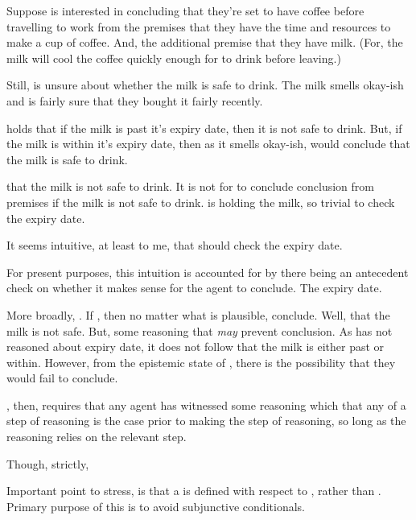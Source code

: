 \begin{note}[\prequ{3}]
  \begin{illustration}
    Suppose  is interested in concluding that they're set to have coffee before travelling to work from the premises that they have the time and resources to make a cup of coffee.
    And, the additional premise that they have milk.
    (For, the milk will cool the coffee quickly enough for  to drink before leaving.)

    Still,  is unsure about whether the milk is safe to drink.
    The milk smells okay-ish and  is fairly sure that they bought it fairly recently.

     holds that if the milk is past it's expiry date, then it is not safe to drink.
    But, if the milk is within it's expiry date, then as it smells okay-ish,  would conclude that the milk is safe to drink.
  \end{illustration}
  \epVAd{} that the milk is not safe to drink.
  It is not \epVAd{} for  to conclude conclusion from premises if the milk is not safe to drink.
   is holding the milk, so trivial to check the expiry date.

  It seems intuitive, at least to me, that  should check the expiry date.

  For present purposes, this intuition is accounted for by there being an antecedent check on whether it makes sense for the agent to conclude.
  The expiry date.

  More broadly, \support{}.
  If \support{}, then no matter what is plausible, conclude.
  Well, that the milk is not safe.
  But, some reasoning that \emph{may} prevent conclusion.
  As  has not reasoned about expiry date, it does not follow that the milk is either past or within.
  However, from the epistemic state of , there is the possibility that they would fail to conclude.
\end{note}

\begin{note}
  \ideaCS{}, then, requires that any agent has witnessed some reasoning which  that any \requ{} of a step of reasoning is the case prior to making the step of reasoning, so long as the reasoning relies on the relevant step.

  Though, strictly, \ideaCS{}
\end{note}

\begin{note}
  Important point to stress, is that a \requ{} is defined with respect to , rather than .
  Primary purpose of this is to avoid subjunctive conditionals.
\end{note}



